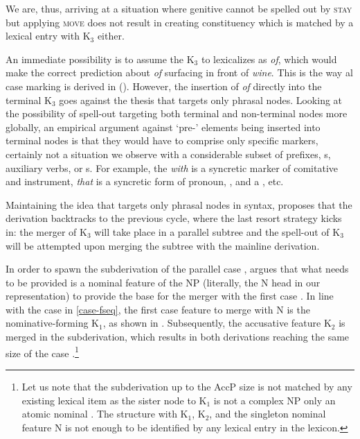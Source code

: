 \vskip -1.15cm
\noindent We are, thus, arriving at a situation where genitive cannot be spelled out by \textsc{stay} but applying \textsc{move} does not result in creating constituency which is matched by a lexical entry with K$_{3}$ either. 
\par
An immediate possibility is to assume the  K$_{3}$ to lexicalizes as \textit{of}, which would make the correct prediction about \textit{of} surfacing in front of \textit{wine}. This is the way al case marking is derived in \citeauthor{Caha2009} (\citeyear{Caha2009,Caha2011}). However, the insertion of \textit{of} directly into the terminal K$_{3}$ goes against the thesis that  targets only phrasal nodes. Looking at the possibility of spell-out targeting both terminal and non-terminal nodes more globally, an empirical argument against `pre-' elements being inserted into terminal nodes is that they would have to comprise only specific markers, certainly not a situation we observe with a considerable subset of prefixes, s, auxiliary verbs, or s. For example, the  \textit{with} is a syncretic marker of comitative and instrument, \textit{that} is a syncretic form of  pronoun, , and a , etc.
\par
Maintaining the idea that  targets only phrasal nodes in syntax, \cite{Starke2018} proposes that the derivation backtracks to the previous cycle, where the last resort strategy kicks in: the merger of K$_{3}$ will take place in a parallel subtree and the spell-out of K$_{3}$ will be attempted upon merging the subtree with the mainline derivation. 
\par
In order to spawn the subderivation of the parallel case , \cite{Starke2018} argues that what needs to be provided is a nominal feature of the NP (literally, the N head in our representation) to provide the base for the merger with the first case . In line with the case  in \ref{case-fseq}, the first case feature to merge with N is the nominative-forming K$_{1}$, as shown in \Next. Subsequently, the accusative feature K$_{2}$ is merged in the subderivation, which results in both derivations reaching the same size of the case .\footnote{Let us note that the subderivation up to the AccP size is not matched by any existing lexical item as the sister node to K$_{1}$ is not a complex NP  only an atomic nominal .  The structure with K$_{1}$, K$_{2}$, and the singleton nominal feature N is not enough to be identified by any lexical entry in the  lexicon.
}%

